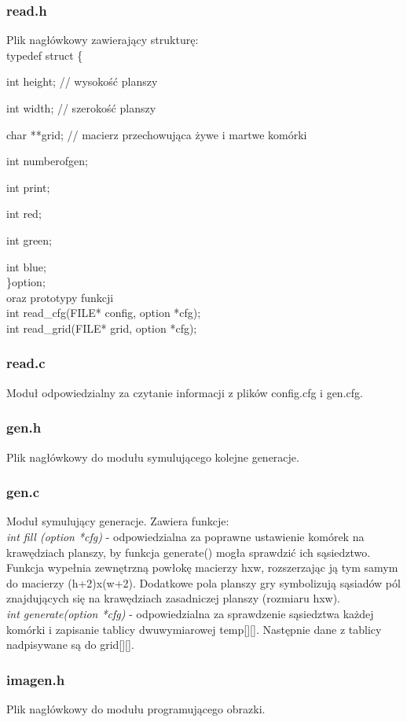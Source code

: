 \documentclass{article}
\begin{document}
\subsubsection*{read.h}
Plik nagłówkowy zawierający strukturę:\\
typedef struct \{\par
int height; // wysokość planszy\par
	int width; // szerokość planszy\par
	char **grid; // macierz przechowująca żywe i martwe komórki\par
	int numberofgen;\par
	int print;\par
	int red;\par
	int green;\par
	int blue;\\
\}option;\\
oraz prototypy funkcji \\
int read\_cfg(FILE* config, option *cfg);\\
int read\_grid(FILE* grid, option *cfg);\\
\subsubsection*{read.c}
Moduł odpowiedzialny za czytanie informacji z plików config.cfg i gen.cfg.
\subsubsection*{gen.h}
Plik nagłówkowy do modułu symulującego kolejne generacje.
\subsubsection*{gen.c}
Moduł symulujący generacje. Zawiera funkcje:\\
\emph{int fill (option *cfg) }- odpowiedzialna za poprawne ustawienie komórek na krawędziach planszy, by funkcja generate() mogła sprawdzić ich sąsiedztwo. Funkcja wypełnia zewnętrzną powłokę macierzy hxw, rozszerzając ją tym samym do macierzy (h+2)x(w+2). Dodatkowe pola planszy gry symbolizują sąsiadów pól znajdujących się na krawędziach zasadniczej planszy (rozmiaru hxw). \\
\emph{int  generate(option *cfg)} - odpowiedzialna za sprawdzenie sąsiedztwa każdej komórki i zapisanie tablicy dwuwymiarowej temp[][]. Następnie dane z tablicy nadpisywane są do grid[][].
\subsubsection*{imagen.h}
Plik nagłówkowy do modułu programującego obrazki.
\end{document}

